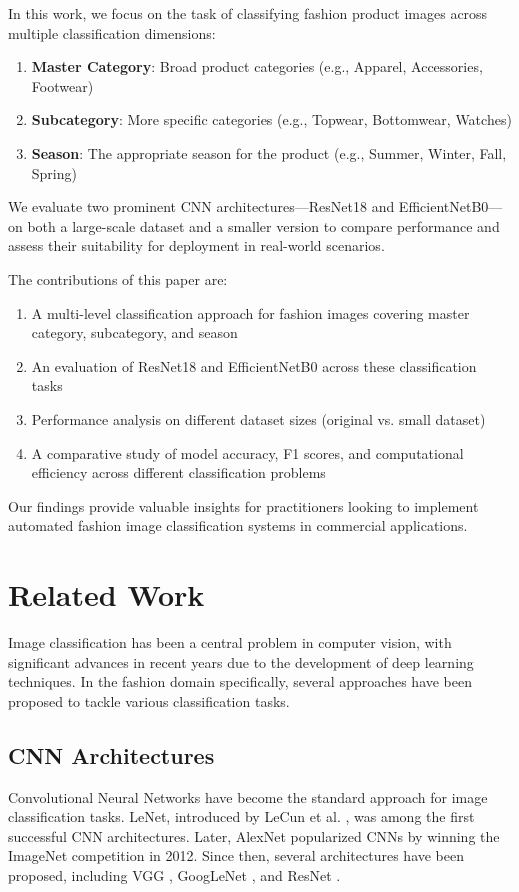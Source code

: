 \documentclass[10pt,journal,compsoc]{IEEEtran}
\begin{document}
In this work, we focus on the task of classifying fashion product images across multiple classification dimensions:

\begin{enumerate}
\item \textbf{Master Category}: Broad product categories (e.g., Apparel, Accessories, Footwear)
\item \textbf{Subcategory}: More specific categories (e.g., Topwear, Bottomwear, Watches)
\item \textbf{Season}: The appropriate season for the product (e.g., Summer, Winter, Fall, Spring)
\end{enumerate}

We evaluate two prominent CNN architectures---ResNet18 and EfficientNetB0---on both a large-scale dataset and a smaller version to compare performance and assess their suitability for deployment in real-world scenarios.

The contributions of this paper are:
\begin{enumerate}
\item A multi-level classification approach for fashion images covering master category, subcategory, and season
\item An evaluation of ResNet18 and EfficientNetB0 across these classification tasks
\item Performance analysis on different dataset sizes (original vs. small dataset)
\item A comparative study of model accuracy, F1 scores, and computational efficiency across different classification problems
\end{enumerate}

Our findings provide valuable insights for practitioners looking to implement automated fashion image classification systems in commercial applications.

\section{Related Work}
Image classification has been a central problem in computer vision, with significant advances in recent years due to the development of deep learning techniques. In the fashion domain specifically, several approaches have been proposed to tackle various classification tasks.

\subsection{CNN Architectures}
Convolutional Neural Networks have become the standard approach for image classification tasks. LeNet, introduced by LeCun et al. \cite{lecun1998gradient}, was among the first successful CNN architectures. Later, AlexNet \cite{krizhevsky2012imagenet} popularized CNNs by winning the ImageNet competition in 2012. Since then, several architectures have been proposed, including VGG \cite{simonyan2014very}, GoogLeNet \cite{szegedy2015going}, and ResNet \cite{he2016deep}.
\end{document}
